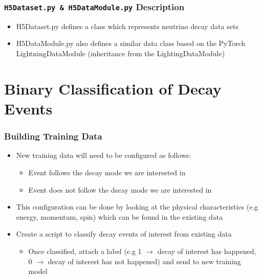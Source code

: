 \documentclass{beamer}
\begin{document}


\begin{frame}
	\frametitle{\texttt{H5Dataset.py \& H5DataModule.py} Description}
	
	\begin{itemize}
		\item H5Dataset.py defines a class which represents neutrino decay data sets
		\item H5DataModule.py also defines a similar data class based on the PyTorch LightningDataModule (inheritance from the LightingDataModule)
	\end{itemize}
\end{frame}


\section{Binary Classification of Decay Events}

\begin{frame}
\frametitle{Building Training Data}
	\begin{itemize}
		\item New training data will need to be configured as follows:
			\begin{itemize}
				\item Event follows the decay mode we are interested in
				\item Event does not follow the decay mode we are interested in
			\end{itemize}
		\item This configuration can be done by looking at the physical characteristics (e.g energy, momentum, spin) which can be found in the existing data
		\item Create a script to classify decay events of interest from existing data
			\begin{itemize}
				\item Once classified, attach a label (e.g 1 $\rightarrow$ decay of interest has happened, 0 $\rightarrow$ decay of interest has not happened) and send to new training model
			\end{itemize}
	\end{itemize}
\end{frame}
\end{document}
